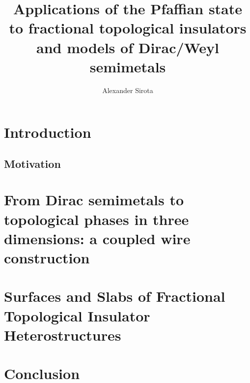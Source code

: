 \documentclass[aps,prb,preprint,showpacs,eqsecnum,superscriptaddress,floatfix]{revtex4-1}
\begin{document}
	\title{Applications of the Pfaffian state to fractional topological insulators and models of Dirac/Weyl semimetals}
	\author{Alexander Sirota}
	\begin{abstract}
		
	\end{abstract}
\maketitle %
{ %
	\hypersetup{linkcolor=black}
	\tableofcontents
}
 

\section{Introduction}
\subsection{Motivation}


%
\section{From Dirac semimetals to topological phases in three dimensions: a coupled wire construction}

\section{Surfaces and Slabs of Fractional Topological Insulator Heterostructures}

\section{Conclusion}



\end{document}
